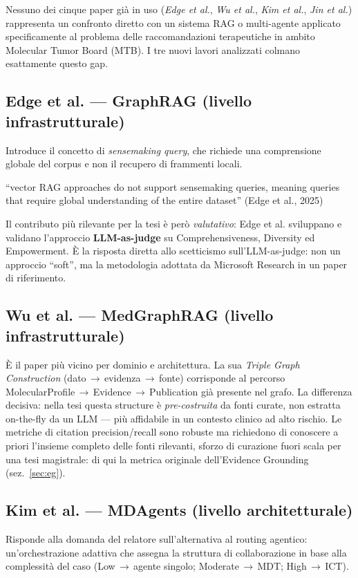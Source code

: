 \documentclass[11pt,a4paper]{article}
\begin{document}
Nessuno dei cinque paper già in uso (\emph{Edge et al.}, \emph{Wu et al.}, \emph{Kim et al.}, \emph{Jin et al.}) rappresenta un confronto diretto con un sistema RAG o multi-agente applicato specificamente al problema delle raccomandazioni terapeutiche in ambito Molecular Tumor Board (MTB). I tre nuovi lavori analizzati colmano esattamente questo gap.

\subsection{Edge et al. --- GraphRAG (livello infrastrutturale)}
Introduce il concetto di \emph{sensemaking query}, che richiede una comprensione globale del corpus e non il recupero di frammenti locali.

\begin{quotebox}
``vector RAG approaches do not support sensemaking queries, meaning queries that require global understanding of the entire dataset'' \hfill (Edge et al., 2025)
\end{quotebox}

\noindent Il contributo pi\`u rilevante per la tesi \`e per\`o \emph{valutativo}: Edge et al. sviluppano e validano l'approccio \textbf{LLM-as-judge} su Comprehensiveness, Diversity ed Empowerment. \`E la risposta diretta allo scetticismo sull'LLM-as-judge: non un approccio ``soft'', ma la metodologia adottata da Microsoft Research in un paper di riferimento.

\subsection{Wu et al. --- MedGraphRAG (livello infrastrutturale)}
\`E il paper pi\`u vicino per dominio e architettura. La sua \emph{Triple Graph Construction} (dato\,$\to$\,evidenza\,$\to$\,fonte) corrisponde al percorso MolecularProfile\,$\to$\,Evidence\,$\to$\,Publication gi\`a presente nel grafo. La differenza decisiva: nella tesi questa structure \`e \emph{pre-costruita} da fonti curate, non estratta on-the-fly da un LLM --- pi\`u affidabile in un contesto clinico ad alto rischio. Le metriche di citation precision/recall sono robuste ma richiedono di conoscere a priori l'insieme completo delle fonti rilevanti, sforzo di curazione fuori scala per una tesi magistrale: di qui la metrica originale dell'Evidence Grounding (sez.~\ref{sec:eg}).

\subsection{Kim et al. --- MDAgents (livello architetturale)}
Risponde alla domanda del relatore sull'alternativa al routing agentico: un'orchestrazione adattiva che assegna la struttura di collaborazione in base alla complessit\`a del caso (Low\,$\to$\,agente singolo; Moderate\,$\to$\,MDT; High\,$\to$\,ICT).
\end{document}
